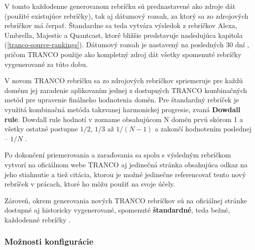 V tomto každodenne generovanom rebríčku sú prednastavené ako zdroje dát (použité existujúce rebríčky), tak aj dátumový rozsah, za ktorý sa zo zdrojových rebríčkov má čerpať.
Štandardne sa teda vytvára výsledok z rebríčkov Alexa, Umbrella, Majestic a Quantcast, ktoré bližšie predstavuje nasledujúca kapitola (\ref{tranco-source-rankings}). 
Dátumový rozsah je nastavený na posledných 30 dní \cite{tranco-github}, pričom TRANCO použije ako kompletný zdroj dát všetky spomenuté rebríčky vygenerované za túto dobu. 

V novom TRANCO rebríčku sa zo zdrojových rebríčkov spriemeruje pre každú doménu jej zaradenie aplikovaním jednej z dostupných TRANCO kombinačných metód pre upravenie finálneho hodnotenia domén.
Pre štandardný rebríček je využitá kombinačná metóda takzvanej harmonickej progresie, zvaná \textbf{Dowdall rule}. Dowdall rule hodnotí v zozname obsahujúcom N domén prvú skórom 1 a všetky ostatné postupne \(1/2\), \(1/3\) až \(1/(N-1)\) a zakončí hodnotením poslednej -- \(1/N\) \cite{tranco}\cite{tranco-homepage}.

Po dokončení priemerovania a zaraďovania sa spolu s výsledným rebríčkom vytvorí na oficiálnom webe TRANCO aj jedinečná stránka obsahujúca odkaz na jeho stiahnutie a tiež citácia, 
ktorou je možné jedinečne referencovať tento nový rebríček v prácach, ktoré ho môžu použiť na svoje účely.

Zároveň, okrem generovania nových TRANCO rebríčkov sú na oficiálnej stránke dostupné aj historicky vygenerované, spomenuté \textbf{štandardné}, teda bežné, každodenné rebríčky \cite{tranco-homepage}.

\subsubsection{Možnosti konfigurácie}
\label{tranco-config}

